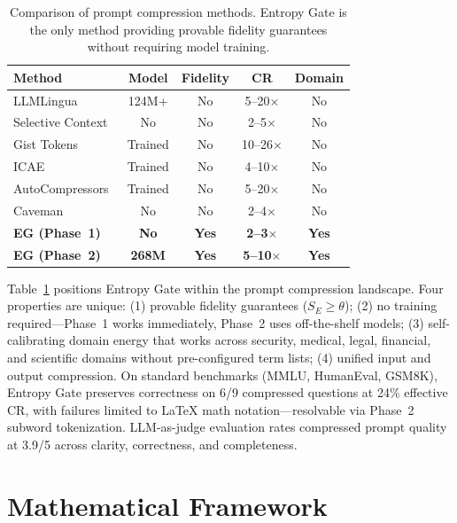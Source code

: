 \documentclass[11pt]{article}
\theoremstyle{remark}
\begin{document}
\begin{table}[H]
\centering
\caption{Comparison of prompt compression methods. Entropy Gate is the only
method providing provable fidelity guarantees without requiring model training.}
\label{tab:method-comparison}
\small
\begin{tabular}{lcccc}
\toprule
Method & Model & Fidelity & CR & Domain \\
\midrule
LLMLingua~\cite{llmlingua2023} & 124M+ & No & 5--20$\times$ & No \\
Selective Context~\cite{selective_context2023} & No & No & 2--5$\times$ & No \\
Gist Tokens~\cite{gist2023} & Trained & No & 10--26$\times$ & No \\
ICAE~\cite{icae2024} & Trained & No & 4--10$\times$ & No \\
AutoCompressors~\cite{chevalier2023} & Trained & No & 5--20$\times$ & No \\
Caveman~\cite{caveman_plugin} & No & No & 2--4$\times$ & No \\
\textbf{EG (Phase~1)} & \textbf{No} & \textbf{Yes} & \textbf{2--3$\times$} & \textbf{Yes} \\
\textbf{EG (Phase~2)} & \textbf{268M} & \textbf{Yes} & \textbf{5--10$\times$} & \textbf{Yes} \\
\bottomrule
\end{tabular}
\end{table}

Table~\ref{tab:method-comparison} positions Entropy Gate within the prompt
compression landscape. Four properties are unique: (1) provable fidelity
guarantees ($S_E \geq \theta$); (2) no training required---Phase~1 works
immediately, Phase~2 uses off-the-shelf models; (3) self-calibrating domain
energy that works across security, medical, legal, financial, and scientific
domains without pre-configured term lists; (4) unified input and output
compression. On standard benchmarks (MMLU, HumanEval, GSM8K), Entropy Gate
preserves correctness on 6/9 compressed questions at 24\% effective CR, with
failures limited to LaTeX math notation---resolvable via Phase~2 subword
tokenization. LLM-as-judge evaluation rates compressed prompt quality at
3.9/5 across clarity, correctness, and completeness.

\section{Mathematical Framework}
\end{document}
